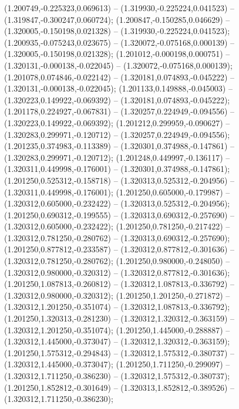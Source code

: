  (1.200749,-0.225323,0.069613) -- (1.319930,-0.225224,0.041523) -- (1.319847,-0.300247,0.060724);
 (1.200847,-0.150285,0.046629) -- (1.320005,-0.150198,0.021328) -- (1.319930,-0.225224,0.041523);
 (1.200935,-0.075243,0.023675) -- (1.320072,-0.075168,0.000139) -- (1.320005,-0.150198,0.021328);
 (1.201012,-0.000198,0.000751) -- (1.320131,-0.000138,-0.022045) -- (1.320072,-0.075168,0.000139);
 (1.201078,0.074846,-0.022142) -- (1.320181,0.074893,-0.045222) -- (1.320131,-0.000138,-0.022045);
 (1.201133,0.149888,-0.045003) -- (1.320223,0.149922,-0.069392) -- (1.320181,0.074893,-0.045222);
 (1.201178,0.224927,-0.067831) -- (1.320257,0.224949,-0.094556) -- (1.320223,0.149922,-0.069392);
 (1.201212,0.299959,-0.090627) -- (1.320283,0.299971,-0.120712) -- (1.320257,0.224949,-0.094556);
 (1.201235,0.374983,-0.113389) -- (1.320301,0.374988,-0.147861) -- (1.320283,0.299971,-0.120712);
 (1.201248,0.449997,-0.136117) -- (1.320311,0.449998,-0.176001) -- (1.320301,0.374988,-0.147861);
 (1.201250,0.525312,-0.158718) -- (1.320313,0.525312,-0.204956) -- (1.320311,0.449998,-0.176001);
 (1.201250,0.605000,-0.179987) -- (1.320312,0.605000,-0.232422) -- (1.320313,0.525312,-0.204956);
 (1.201250,0.690312,-0.199555) -- (1.320313,0.690312,-0.257690) -- (1.320312,0.605000,-0.232422);
 (1.201250,0.781250,-0.217422) -- (1.320312,0.781250,-0.280762) -- (1.320313,0.690312,-0.257690);
 (1.201250,0.877812,-0.233587) -- (1.320312,0.877812,-0.301636) -- (1.320312,0.781250,-0.280762);
 (1.201250,0.980000,-0.248050) -- (1.320312,0.980000,-0.320312) -- (1.320312,0.877812,-0.301636);
 (1.201250,1.087813,-0.260812) -- (1.320312,1.087813,-0.336792) -- (1.320312,0.980000,-0.320312);
 (1.201250,1.201250,-0.271872) -- (1.320312,1.201250,-0.351074) -- (1.320312,1.087813,-0.336792);
 (1.201250,1.320313,-0.281230) -- (1.320312,1.320312,-0.363159) -- (1.320312,1.201250,-0.351074);
 (1.201250,1.445000,-0.288887) -- (1.320312,1.445000,-0.373047) -- (1.320312,1.320312,-0.363159);
 (1.201250,1.575312,-0.294843) -- (1.320312,1.575312,-0.380737) -- (1.320312,1.445000,-0.373047);
 (1.201250,1.711250,-0.299097) -- (1.320312,1.711250,-0.386230) -- (1.320312,1.575312,-0.380737);
 (1.201250,1.852812,-0.301649) -- (1.320313,1.852812,-0.389526) -- (1.320312,1.711250,-0.386230);
